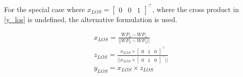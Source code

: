 For the special case where $x_{LOS} = \begin{bmatrix} 0&0&1\end{bmatrix}^\top$, where the cross product in \eqref{y_los} is undefined, the alternative formulation is used.

\begin{align}
    x_{LOS} = \frac{WP_2 - WP_1}{||WP_2 - WP_1||} \\
    z_{LOS} = \frac{x_{LOS} \times \begin{bmatrix} 0&1&0\end{bmatrix}^\top}{|| x_{LOS} \times \begin{bmatrix} 0&1&0\end{bmatrix}^\top ||}\\ 
    y_{LOS} = x_{LOS} \times z_{LOS}
\end{align}


